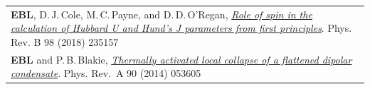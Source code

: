\documentclass[10pt,a4paper,final]{article}
\begin{document}
\begin{tabularx}{\textwidth}{
   X}
   \footnotesize \textbf{EBL}, D.\,J.\,Cole, M.\,C.\,Payne, and D.\,D.\,O'Regan, \href{https://journals.aps.org/prb/abstract/10.1103/PhysRevB.98.235157}{\textit{Role of spin in the calculation of Hubbard U and Hund’s J parameters from first principles}}. Phys. Rev. B 98 (2018) 235157                                                                                                                                                                                                                                                                                                                                                                                                                                                                                         \\ %
   \footnotesize \textbf{EBL} and P.\,B.\,Blakie, \href{https://journals.aps.org/pra/pdf/10.1103/PhysRevA.90.053605}{\textit{Thermally activated local collapse of a flattened dipolar condensate}}. Phys. Rev.~A 90 (2014) 053605                                                                                                                                                                                                                                                                                                                                                                                                                                                                                                                                                   \\ %
\end{tabularx}
\end{document}
